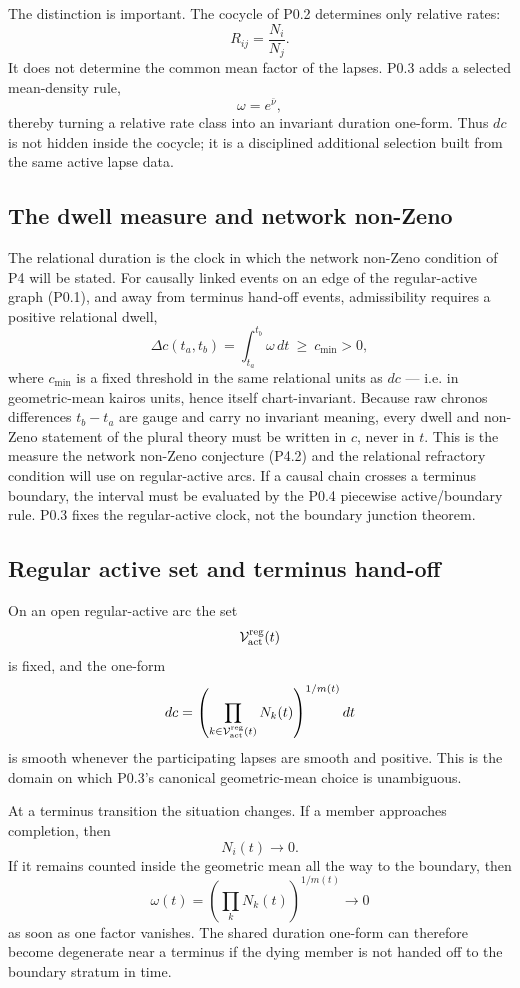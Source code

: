 \documentclass[11pt,a4paper]{article}
\def\mathfrak#1{#1}%
\def\emph#1{#1}%
\theoremstyle{definition}
\theoremstyle{plain}
\theoremstyle{remark}
\begin{document}
The distinction is important. The cocycle of P0.2 determines only relative
rates:
\[
R_{ij}=\frac{N_i}{N_j}.
\]
It does not determine the common mean factor of the lapses. P0.3 adds a selected
mean-density rule,
\[
\omega=e^{\bar\nu},
\]
thereby turning a relative rate class into an invariant duration one-form. Thus
\(d\mathfrak c\) is not hidden inside the cocycle; it is a disciplined additional
selection built from the same active lapse data.

\subsection{The dwell measure and network non-Zeno}

The relational duration is the clock in which the network non-Zeno condition of P4
will be stated. For causally linked events on an edge of the regular-active graph
(P0.1), and away from terminus hand-off events, admissibility requires a positive
relational dwell,
\[
\Delta\mathfrak c(t_a,t_b)=\int_{t_a}^{t_b}\omega\,dt\ \geq\ \mathfrak c_{\min}>0 ,
\]
where \(\mathfrak c_{\min}\) is a fixed threshold \emph{in the same relational units}
as \(d\mathfrak c\) --- i.e. in geometric-mean kairos units, hence itself
chart-invariant. Because raw chronos differences \(t_b-t_a\) are gauge and carry no
invariant meaning, every dwell and non-Zeno statement of the plural theory must be
written in \(\mathfrak c\), never in \(t\). This is the measure the network non-Zeno
conjecture (P4.2) and the relational refractory condition will use on regular-active
arcs. If a causal chain crosses a terminus boundary, the interval must be evaluated
by the P0.4 piecewise active/boundary rule. P0.3 fixes the regular-active clock, not
the boundary junction theorem.

\subsection{Regular active set and terminus hand-off}

On an open regular-active arc the set
\[
\mathcal V_{\rm act}^{\rm reg}(t)
\]
is fixed, and the one-form
\[
d\mathfrak c
=
\left(
\prod_{k\in\mathcal V_{\rm act}^{\rm reg}(t)}
N_k(t)
\right)^{1/m(t)}dt
\]
is smooth whenever the participating lapses are smooth and positive. This is the
domain on which P0.3's canonical geometric-mean choice is unambiguous.

At a terminus transition the situation changes. If a member approaches completion,
then
\[
N_i(t)\to0.
\]
If it remains counted inside the geometric mean all the way to the boundary, then
\[
\omega(t)
=
\left(
\prod_k N_k(t)
\right)^{1/m(t)}
\to0
\]
as soon as one factor vanishes. The shared duration one-form can therefore become
degenerate near a terminus if the dying member is not handed off to the boundary
stratum in time.
\end{document}
